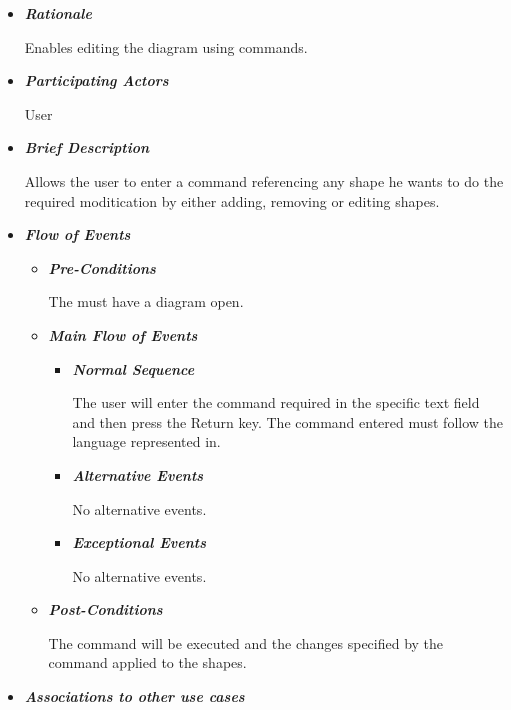 \begin{itemize}

\item {\bf \em Rationale}
\par \noindent
Enables editing the diagram using commands.

\item {\bf \em Participating Actors}
\par \noindent
User

\item {\bf \em Brief Description}
\par \noindent
Allows the user to enter a command referencing any shape he wants to do the required moditication by either adding, removing or editing shapes.

\item {\bf \em Flow of Events}

\begin{itemize}

\item {\bf \em Pre-Conditions}
\par \noindent
The must have a diagram open.
\item {\bf \em Main Flow of Events}

\begin{itemize}

\item {\bf \em Normal Sequence}
\par \noindent
The user will enter the command required in the specific text field and then press the Return key. The command entered must follow the language represented in.

\item {\bf \em Alternative Events}
\par \noindent
No alternative events.

\item {\bf \em Exceptional Events}
\par \noindent
No alternative events.

\end{itemize}

\item {\bf \em Post-Conditions}
\par \noindent
The command will be executed and the changes specified by the command applied to the shapes.

\end{itemize}

\item {\bf \em Associations to other use cases}


\end{itemize}
